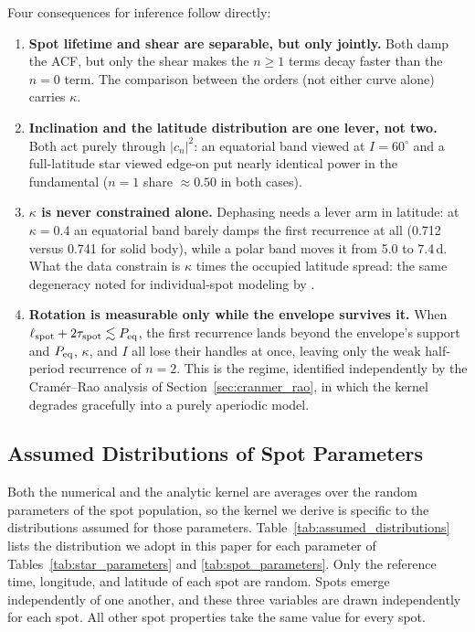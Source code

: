 \documentclass[preprint]{aastex702}
\begin{document}
Four consequences for inference follow directly:
\begin{enumerate}[nosep]
    \item \textbf{Spot lifetime and shear are separable, but only jointly.} Both damp the ACF, but only the shear makes the $n \geq 1$ terms decay faster than the $n = 0$ term. The comparison between the orders (not either curve alone) carries $\kappa$.
    \item \textbf{Inclination and the latitude distribution are one lever, not two.} Both act purely through $|c_n|^2$: an equatorial band viewed at $I = 60^\circ$ and a full-latitude star viewed edge-on put nearly identical power in the fundamental ($n = 1$ share $\approx 0.50$ in both cases). 
    \item \textbf{$\kappa$ is never constrained alone.} Dephasing needs a lever arm in latitude: at $\kappa = 0.4$ an equatorial band barely damps the first recurrence at all (0.712 versus 0.741 for solid body), while a polar band moves it from 5.0 to 7.4\,d. What the data constrain is $\kappa$ times the occupied latitude spread: the same degeneracy noted for individual-spot modeling by \citet{basri_information_2020}.
    \item \textbf{Rotation is measurable only while the envelope survives it.} When $\ell_{\rm spot} + 2\tau_{\rm spot} \lesssim P_{\rm eq}$, the first recurrence lands beyond the envelope's support and $P_{\rm eq}$, $\kappa$, and $I$ all lose their handles at once, leaving only the weak half-period recurrence of $n = 2$. This is the regime, identified independently by the Cram\'er--Rao analysis of Section~\ref{sec:cranmer_rao}, in which the kernel degrades gracefully into a purely aperiodic model.
\end{enumerate}

\subsection{Assumed Distributions of Spot Parameters} \label{sec:assumed_distributions}

Both the numerical and the analytic kernel are averages over the random parameters of the spot population, so the kernel we derive is specific to the distributions assumed for those parameters. Table~\ref{tab:assumed_distributions} lists the distribution we adopt in this paper for each parameter of Tables~\ref{tab:star_parameters} and \ref{tab:spot_parameters}. Only the reference time, longitude, and latitude of each spot are random. Spots emerge independently of one another, and these three variables are drawn independently for each spot. All other spot properties take the same value for every spot.
\end{document}
